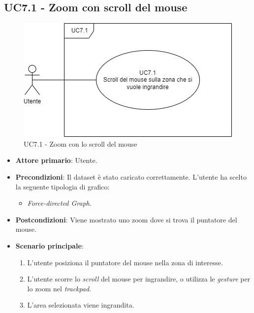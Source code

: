 \subsection{UC7.1 - Zoom con scroll del mouse}
\label{sec:UC7.1}
\begin{figure}[h!]
    \centering
    \includegraphics[scale=0.55]{../../assets/zoom_mouse.png}
    \caption{UC7.1 - Zoom con lo scroll del mouse}
\end{figure}
\begin{itemize}
    \item \textbf{Attore primario}: Utente.
    \item \textbf{Precondizioni}: Il dataset è stato caricato correttamente. L'utente ha scelto la seguente tipologia di grafico:
    \begin{itemize}
          \item \textit{Force-directed Graph}.
    \end{itemize}
    \item \textbf{Postcondizioni}: Viene mostrato uno zoom dove si trova il puntatore del mouse.
    \item \textbf{Scenario principale}:
          \begin{enumerate}
              \item L'utente posiziona il puntatore del mouse nella zona di interesse.
              \item L'utente scorre lo \textit{scroll} del mouse per ingrandire, o utilizza le \textit{gesture} per lo zoom nel \textit{trackpad}.
              \item L'area selezionata viene ingrandita.
          \end{enumerate}
\end{itemize}

\newpage

